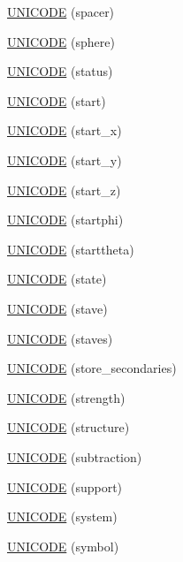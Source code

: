 \begin{DoxyCompactItemize}
\item 
\hyperlink{namespace_d_d4hep_1_1_x_m_l_af243b19120675001464062077850f70e}{UNICODE} (spacer)
\item 
\hyperlink{namespace_d_d4hep_1_1_x_m_l_aae2c3b65d9a48eeb4fc6392a1cc3c2c3}{UNICODE} (sphere)
\item 
\hyperlink{namespace_d_d4hep_1_1_x_m_l_ac58042b51ed2308de2f119f437a1bb21}{UNICODE} (status)
\item 
\hyperlink{namespace_d_d4hep_1_1_x_m_l_ad2491bbf530cff79229435d693b4f080}{UNICODE} (start)
\item 
\hyperlink{namespace_d_d4hep_1_1_x_m_l_a4f8641b1ed5d0087f273490343694903}{UNICODE} (start\_\-x)
\item 
\hyperlink{namespace_d_d4hep_1_1_x_m_l_a7867555bd95f3d1f790dd70083c2c6aa}{UNICODE} (start\_\-y)
\item 
\hyperlink{namespace_d_d4hep_1_1_x_m_l_a3a7209b884fa528e3fc2d87d4eab7154}{UNICODE} (start\_\-z)
\item 
\hyperlink{namespace_d_d4hep_1_1_x_m_l_a25a3a43fcd0ddc0dfe49a188efb7ea33}{UNICODE} (startphi)
\item 
\hyperlink{namespace_d_d4hep_1_1_x_m_l_a09dfb6a2a7274824928194d0dd553ee5}{UNICODE} (starttheta)
\item 
\hyperlink{namespace_d_d4hep_1_1_x_m_l_a6017eafed0b49e22a5b5ef940452d648}{UNICODE} (state)
\item 
\hyperlink{namespace_d_d4hep_1_1_x_m_l_a607e9ca7ddb201b8bd6396f730f46da0}{UNICODE} (stave)
\item 
\hyperlink{namespace_d_d4hep_1_1_x_m_l_a9db672b598862b8117f1440a2ed76526}{UNICODE} (staves)
\item 
\hyperlink{namespace_d_d4hep_1_1_x_m_l_a2c01c23fd0b2c71d55c935516e00fb0b}{UNICODE} (store\_\-secondaries)
\item 
\hyperlink{namespace_d_d4hep_1_1_x_m_l_a51b8b821c7c7382afe7d64ac1e2b6f54}{UNICODE} (strength)
\item 
\hyperlink{namespace_d_d4hep_1_1_x_m_l_abf3ada9748fe4fc5e7c446a45425b76a}{UNICODE} (structure)
\item 
\hyperlink{namespace_d_d4hep_1_1_x_m_l_a828a692e179626778ed33dc45049aa84}{UNICODE} (subtraction)
\item 
\hyperlink{namespace_d_d4hep_1_1_x_m_l_a615eeaf8af96a5d5e33bb326e78797ee}{UNICODE} (support)
\item 
\hyperlink{namespace_d_d4hep_1_1_x_m_l_a99cc902998e63431d33e375b133be60e}{UNICODE} (system)
\item 
\hyperlink{namespace_d_d4hep_1_1_x_m_l_ac099d1e5d54edbc9f71b3629ddf164f5}{UNICODE} (symbol)

\end{DoxyCompactItemize}
